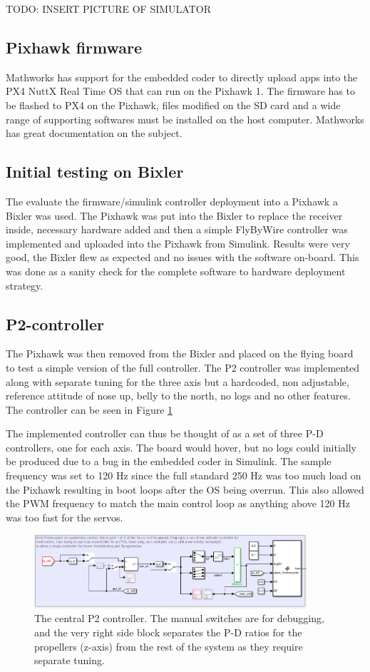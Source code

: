 \documentclass{article}
\begin{document}
TODO: INSERT PICTURE OF SIMULATOR

\subsection{Pixhawk firmware}
Mathworks has support for the embedded coder to directly upload apps into the PX4 NuttX Real Time OS that can run on the Pixhawk 1.
The firmware has to be flashed to PX4 on the Pixhawk, files modified on the SD card and a wide range of supporting softwares must be installed on the host computer.
Mathworks has great documentation on the subject.\cite{MathworksPX4}

\subsection{Initial testing on Bixler}
The evaluate the firmware/simulink controller deployment into a Pixhawk a Bixler was used.
The Pixhawk was put into the Bixler to replace the receiver inside, necessary hardware added and then a simple FlyByWire controller was implemented and uploaded into the Pixhawk from Simulink.
Results were very good, the Bixler flew as expected and no issues with the software on-board.
This was done as a sanity check for the complete software to hardware deployment strategy.


\subsection{P2-controller}
The Pixhawk was then removed from the Bixler and placed on the flying board to test a simple version of the full controller.
The P2 controller \cite{P2} was implemented along with separate tuning for the three axis but a hardcoded, non adjustable, reference attitude of nose up, belly to the north, no logs and no other features.
The controller can be seen in Figure \ref{fig:P2_simulink}

The implemented controller can thus be thought of as a set of three P-D controllers, one for each axis.
The board would hover, but no logs could initially be produced due to a bug in the embedded coder in Simulink.
The sample frequency was set to 120 Hz since the full standard 250 Hz was too much load on the Pixhawk resulting in boot loops after the OS being overrun.
This also allowed the PWM frequency to match the main control loop as anything above 120 Hz was too fast for the servos.

\begin{figure}
    \center
    \includegraphics[width=0.9\textwidth]{P2.PNG}
    \caption{The central P2 controller. The manual switches are for debugging, and the very right side block separates the P-D ratios for the propellers (z-axis) from the rest of the system as they require separate tuning.}
    \label{fig:P2_simulink}
\end{figure}
\end{document}
